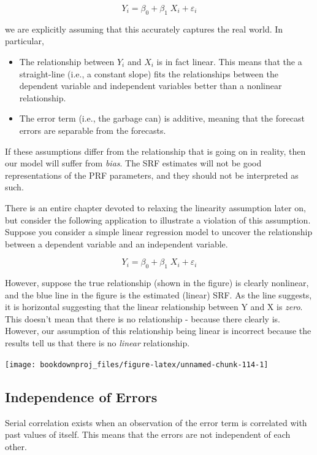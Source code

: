 \documentclass[
]{book}
\begin{document}
\[Y_i = \beta_0 + \beta_1 \;X_{i}+\varepsilon_i\]

we are explicitly assuming that this accurately captures the real world. In particular,

\begin{itemize}
\item
  The relationship between \(Y_i\) and \(X_i\) is in fact linear. This means that the a straight-line (i.e., a constant slope) fits the relationships between the dependent variable and independent variables better than a nonlinear relationship.
\item
  The error term (i.e., the garbage can) is additive, meaning that the forecast errors are separable from the forecasts.
\end{itemize}

If these assumptions differ from the relationship that is going on in reality, then our model will suffer from \emph{bias}. The SRF estimates will not be good representations of the PRF parameters, and they should not be interpreted as such.

There is an entire chapter devoted to relaxing the linearity assumption later on, but consider the following application to illustrate a violation of this assumption. Suppose you consider a simple linear regression model to uncover the relationship between a dependent variable and an independent variable.

\[Y_i=\beta_0+\beta_1 \; X_i+\varepsilon_i\]

However, suppose the true relationship (shown in the figure) is clearly nonlinear, and the blue line in the figure is the estimated (linear) SRF. As the line suggests, it is horizontal suggesting that the linear relationship between Y and X is \emph{zero}. This doesn't mean that there is no relationship - because there clearly is. However, our assumption of this relationship being linear is incorrect because the results tell us that there is no \emph{linear} relationship.

\begin{center}\texttt{[image: bookdownproj\_files/figure-latex/unnamed-chunk-114-1]} \end{center}

\hypertarget{independence-of-errors}{%
\subsection{Independence of Errors}\label{independence-of-errors}}

Serial correlation exists when an observation of the error term is correlated with past values of itself. This means that the errors are not independent of each other.
\end{document}
